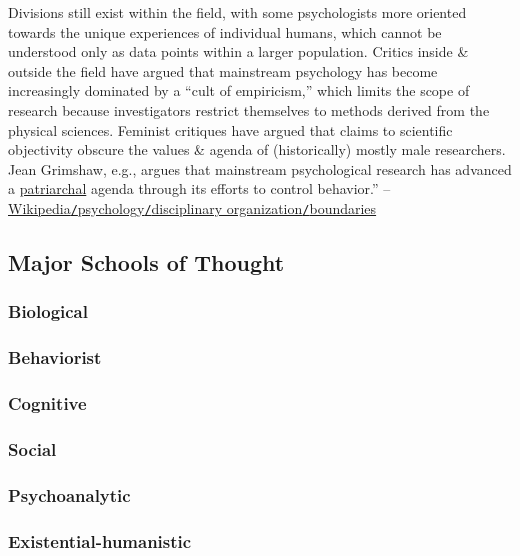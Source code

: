 \documentclass[oneside]{book}
\numberwithin{equation}{section}
\begin{document}
Divisions still exist within the field, with some psychologists more oriented towards the unique experiences of individual humans, which cannot be understood only as data points within a larger population. Critics inside \& outside the field have argued that mainstream psychology has become increasingly dominated by a ``cult of empiricism,'' which limits the scope of research because investigators restrict themselves to methods derived from the physical sciences. Feminist critiques have argued that claims to scientific objectivity obscure the values \& agenda of (historically) mostly male researchers. Jean Grimshaw, e.g., argues that mainstream psychological research has advanced a \href{https://en.wikipedia.org/wiki/Patriarchal}{patriarchal} agenda through its efforts to control behavior.'' -- \href{https://en.wikipedia.org/wiki/Psychology#Boundaries}{Wikipedia\texttt{/}psychology\texttt{/}disciplinary organization\texttt{/}boundaries}

\subsection{Major Schools of Thought}

\subsubsection{Biological}

\subsubsection{Behaviorist}

\subsubsection{Cognitive}

\subsubsection{Social}

\subsubsection{Psychoanalytic}

\subsubsection{Existential-humanistic}
\end{document}
